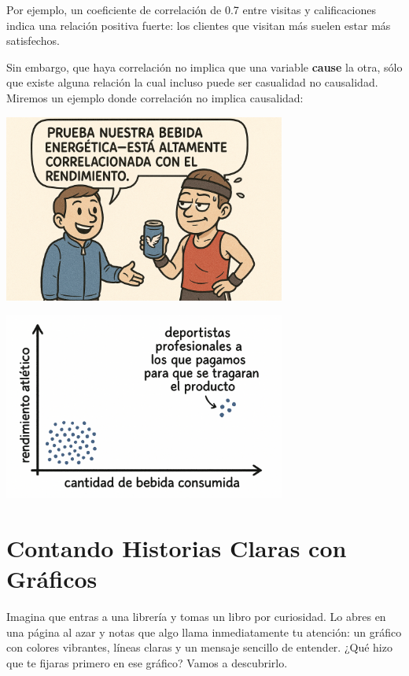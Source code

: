 \documentclass[
  spanish,
  letterpaper,
  DIV=11,
  numbers=noendperiod]{scrreprt}
\begin{document}
Por ejemplo, un coeficiente de correlación de 0.7 entre visitas y
calificaciones indica una relación positiva fuerte: los clientes que
visitan más suelen estar más satisfechos.

Sin embargo, que haya correlación no implica que una variable
\textbf{cause} la otra, sólo que existe alguna relación la cual incluso
puede ser casualidad no causalidad. Miremos un ejemplo donde correlación
no implica causalidad:

\begin{center}
\includegraphics[width=3.64583in,height=\textheight,keepaspectratio]{img/correlacion_1.png}
\end{center}

\begin{center}
\includegraphics[width=3.64583in,height=\textheight,keepaspectratio]{img/correlacion_2.png}
\end{center}


\chapter{Contando Historias Claras con
Gráficos}\label{contando-historias-claras-con-gruxe1ficos}

Imagina que entras a una librería y tomas un libro por curiosidad. Lo
abres en una página al azar y notas que algo llama inmediatamente tu
atención: un gráfico con colores vibrantes, líneas claras y un mensaje
sencillo de entender. ¿Qué hizo que te fijaras primero en ese gráfico?
Vamos a descubrirlo.
\end{document}
